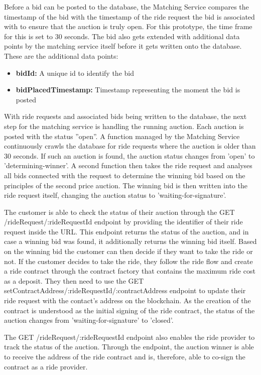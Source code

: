 Before a bid can be posted to the database, the Matching Service compares the timestamp of the bid with the timestamp of the ride request the bid is associated with to ensure that the auction is truly open. For this prototype, the time frame for this is set to 30 seconds. The bid also gets extended with additional data points by the matching service itself before it gets written onto the database. These are the additional data points:

\begin{itemize}
    \item \textbf{bidId:} A unique id to identify the bid
    \item \textbf{bidPlacedTimestamp:} Timestamp representing the moment the bid is posted
\end{itemize}

With ride requests and associated bids being written to the database, the next step for the matching service is handling the running auction. Each auction is posted with the status ''open''. A function managed by the Matching Service continuously crawls the database for ride requests where the auction is older than 30 seconds. If such an auction is found, the auction status changes from 'open' to 'determining-winner'. A second function then takes the ride request and analyses all bids connected with the request to determine the winning bid based on the principles of the second price auction. The winning bid is then written into the ride request itself, changing the auction status to 'waiting-for-signature'. 

The customer is able to check the status of their auction through the GET /rideRequest/:rideRequestId endpoint by providing the identifier of their ride request inside the URL. This endpoint returns the status of the auction, and in case a winning bid was found, it additionally returns the winning bid itself. Based on the winning bid the customer can then decide if they want to take the ride or not. If the customer decides to take the ride, they follow the ride flow and create a ride contract through the contract factory that contains the maximum ride cost as a deposit. They then need to use the GET setContractAddress/:rideRequestId/:contractAddress endpoint to update their ride request with the contact's address on the blockchain. As the creation of the contract is understood as the initial signing of the ride contract, the status of the auction changes from 'waiting-for-signature' to 'closed'. 

The GET /rideRequest/:rideRequestId endpoint also enables the ride provider to track the status of the auction. Through the endpoint, the auction winner is able to receive the address of the ride contract and is, therefore, able to co-sign the contract as a ride provider.

